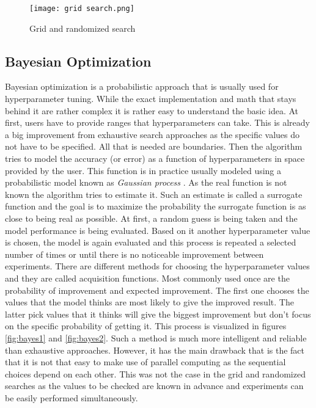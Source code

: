 \documentclass[a4paper,twoside,12pt]{book}
\newcommand*\setcaptioncitation[1]{\def\captioncitation{\textit{Source:}~#1}}
\let\captioncitation\relax
\begin{document}
\begin{figure}[!htb]
    \centering
    \texttt{[image: grid search.png]}
    \setcaptioncitation{\url{https://cutt.ly/ejxGzLh}}
    \caption{Grid and randomized search}
    \label{fig:grid}
\end{figure}

\subsection{Bayesian Optimization}

Bayesian optimization \cite{snoek2012practical} is a probabilistic approach that is usually used for hyperparameter tuning. While the exact implementation and math that stays behind it are rather complex it is rather easy to understand the basic idea.
At first, users have to provide ranges that hyperparameters can take. This is already a big improvement from exhaustive search approaches as the specific values do not have to be specified. All that is needed are boundaries.
Then the algorithm tries to model the accuracy (or error) as a function of hyperparameters in space provided by the user. This function is in practice usually modeled using a probabilistic model known as \emph{Gaussian process} \cite{mackay1998introduction}.
As the real function is not known the algorithm tries to estimate it. Such an estimate is called a surrogate function and the goal is to maximize the probability the surrogate function is as close to being real as possible.
At first, a random guess is being taken and the model performance is being evaluated. Based on it another hyperparameter value is chosen, the model is again evaluated and this process is repeated a selected number of times or until there is no noticeable improvement between experiments.
There are different methods for choosing the hyperparameter values and they are called acquisition functions.
Most commonly used once are the probability of improvement and expected improvement. 
The first one chooses the values that the model thinks are most likely to give the improved result. The latter pick values that it thinks will give the biggest improvement but don't focus on the specific probability of getting it. This process is visualized in figures \ref{fig:bayes1} and \ref{fig:bayes2}.
Such a method is much more intelligent and reliable than exhaustive approaches. 
However, it has the main drawback that is the fact that it is not that easy to make use of parallel computing as the sequential choices depend on each other. 
This was not the case in the grid and randomized searches as the values to be checked are known in advance and experiments can be easily performed simultaneously.
\end{document}
